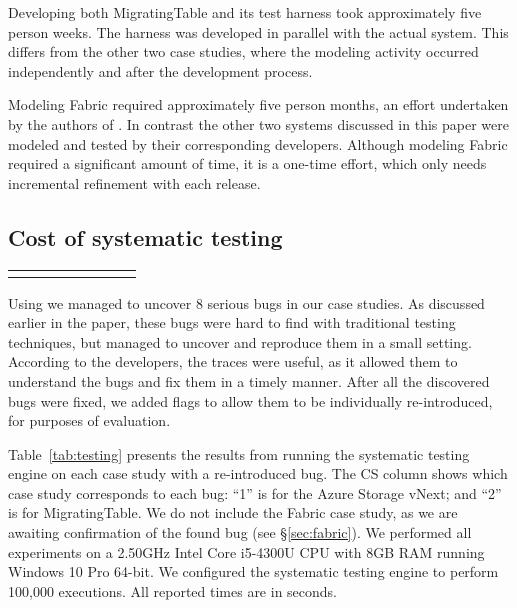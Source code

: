 Developing both MigratingTable and its \psharp test harness took approximately five person weeks. The harness was developed in parallel with the actual system. This differs from the other two case studies, where the modeling activity occurred independently and after the development process.

Modeling Fabric required approximately five person months, an effort undertaken by the authors of \psharp. In contrast the other two systems discussed in this paper were modeled and tested by their corresponding developers. Although modeling Fabric required a significant amount of time, it is a one-time effort, which only needs incremental refinement with each release.

\subsection{Cost of systematic testing}
\label{sec:eval:machine_cost}

\setlength{\tabcolsep}{.68em}
\begin{table*}[t]
\small
\centering
\begin{tabular}{rl rrr rrr}
\centering

\end{tabular}
\caption{Results from running the \psharp random and priority-based systematic testing schedulers for 100,000 executions. We report: whether the bug was found (BF?) (\cmark\xspace means it was found, $\diamond$\xspace means it was found only using a custom test case, and \xmark\xspace means it was not found); time in seconds to find the bug (Time to Bug); and number of nondeterministic choices made in the first execution that found the bug (\#NDC).}
\label{tab:testing}
\end{table*}

Using \psharp we managed to uncover 8 serious bugs in our case studies. As discussed earlier in the paper, these bugs were hard to find with traditional testing techniques, but \psharp managed to uncover and reproduce them in a small setting. According to the developers, the \psharp traces were useful, as it allowed them to understand the bugs and fix them in a timely manner. After all the discovered bugs were fixed, we added flags to allow them to be individually re-introduced, for purposes of evaluation.

Table~\ref{tab:testing} presents the results from running the \psharp systematic testing engine on each case study with a re-introduced bug. The CS column shows which case study corresponds to each bug: ``1'' is for the Azure Storage vNext; and ``2'' is for MigratingTable. We do not include the Fabric case study, as we are awaiting confirmation of the found bug (see \S\ref{sec:fabric}). We performed all experiments on a 2.50GHz Intel Core i5-4300U CPU with 8GB RAM running Windows 10 Pro 64-bit. We configured the \psharp systematic testing engine to perform 100,000 executions. All reported times are in seconds.

